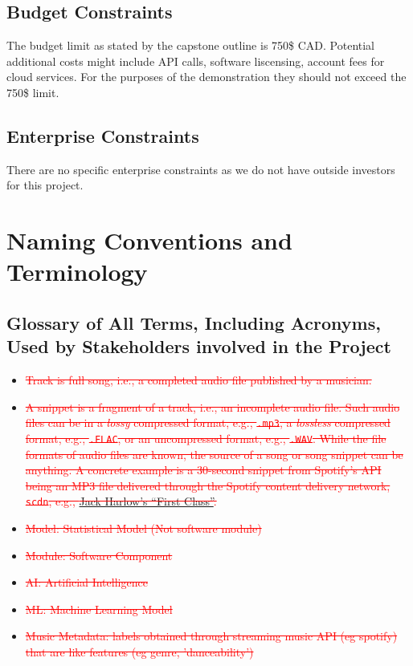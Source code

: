 \documentclass[12pt]{article}
\begin{document}
\subsection{Budget Constraints}
The budget limit as stated by the capstone outline is 750\$ CAD. Potential additional
costs might include API calls, software liscensing, account fees for cloud services. 
For the purposes of the demonstration they should not exceed the 750\$ limit. 

\subsection{Enterprise Constraints}
There are no specific enterprise constraints as we do not have outside investors
for this project. 

\section{Naming Conventions and Terminology}
\subsection{Glossary of All Terms, Including Acronyms, Used by Stakeholders
involved in the Project}
\begin{itemize}
  \item \textcolor{red}{\sout{Track is full song, i.e., a completed audio file published by a musician. }}
  \item\textcolor{red}{\sout{ A snippet is a fragment of a track, i.e., an incomplete audio file. Such audio files can be in a \emph{lossy} compressed format, e.g., 
  \texttt{.mp3}, a \emph{lossless} compressed format, e.g., \texttt{.FLAC}, or an uncompressed format, e.g., \texttt{.WAV}. While the file formats of audio files are known, 
  the source of a song or song snippet can be anything. A concrete example is a 30-second snippet from Spotify's API being an MP3 file delivered through the Spotify content 
  delivery network, \texttt{scdn}, e.g., \href{https://p.scdn.co/mp3-preview/c05a687254dbdf50a9ab4879d85e54a7594e367f?cid=945b9ed74f4c43b49bcf26e7dc388df0}{Jack Harlow's ``First Class''}.}}
  \item \textcolor{red}{\sout{Model: Statistical Model (Not software module)}}
  \item \textcolor{red}{\sout{Module: Software Component}}
  \item \textcolor{red}{\sout{AI: Artificial Intelligence}}
  \item \textcolor{red}{\sout{ML: Machine Learning Model}}
  \item \textcolor{red}{\sout{Music Metadata: labels obtained through streaming music API (eg spotify) that are
  like features (eg genre, 'danceability')}}
\end{itemize}
\end{document}
